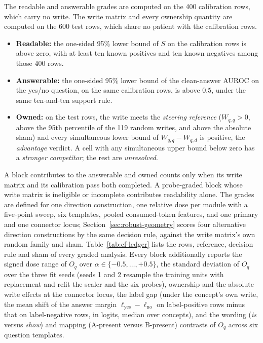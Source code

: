 \documentclass{article}
\begin{document}
The readable and answerable grades are computed on the 400 calibration rows, which carry no write. The write matrix and every ownership quantity are computed on the 600 test rows, which share no patient with the calibration rows.
\begin{itemize}[leftmargin=*,itemsep=1pt,topsep=2pt]
\item \textbf{Readable:} the one-sided 95\% lower bound of $S$ on the calibration rows is above zero, with at least ten known positives and ten known negatives among those 400 rows.
\item \textbf{Answerable:} the one-sided 95\% lower bound of the clean-answer AUROC on the yes/no question, on the same calibration rows, is above $0.5$, under the same ten-and-ten support rule.
\item \textbf{Owned:} on the test rows, the write meets the \emph{steering reference} ($W_{q,q}>0$, above the 95th percentile of the 119 random writes, and above the absolute sham) and every simultaneous lower bound of $W_{q,q}-W_{q,d}$ is positive, the \emph{advantage} verdict. A cell with any simultaneous upper bound below zero has a \emph{stronger competitor}; the rest are \emph{unresolved}.
\end{itemize}
A block contributes to the answerable and owned counts only when its write matrix and its calibration pass both completed. A probe-graded block whose write matrix is ineligible or incomplete contributes readability alone.
The grades are defined for one direction construction, one relative dose per module with a five-point sweep, six templates, pooled consumed-token features, and one primary and one connector locus; Section~\ref{sec:robust-geometry} scores four alternative direction constructions by the same decision rule, against the write matrix's own random family and sham. Table~\ref{tab:cf-ledger} lists the rows, reference, decision rule and sham of every graded analysis.
Every block additionally reports the signed dose range of $O_q$ over $\alpha\in\{-0.5,\ldots,+0.5\}$, the standard deviation of $O_q$ over the three fit seeds (seeds 1 and 2 resample the training units with replacement and refit the scaler and the six probes), ownership and the absolute write effects at the connector locus, the label gap (under the concept's own write, the mean shift of the answer margin $\ell_{\mathrm{yes}}-\ell_{\mathrm{no}}$ on label-positive rows minus that on label-negative rows, in logits, median over concepts), and the wording (\emph{is} versus \emph{show}) and mapping (A-present versus B-present) contrasts of $O_q$ across six question templates.
\end{document}
